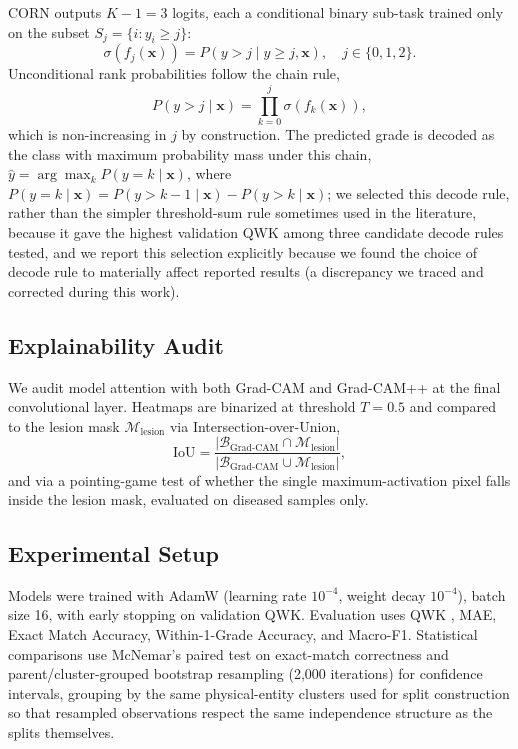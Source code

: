 \documentclass[conference]{IEEEtran}
\begin{document}
CORN outputs $K-1=3$ logits, each a conditional binary sub-task trained only on the subset $S_j=\{i:y_i\ge j\}$:
\begin{equation}
\sigma(f_j(\mathbf{x})) = P(y>j \mid y\ge j, \mathbf{x}), \quad j\in\{0,1,2\}.
\end{equation}
Unconditional rank probabilities follow the chain rule,
\begin{equation}
P(y>j\mid\mathbf{x}) = \prod_{k=0}^{j}\sigma(f_k(\mathbf{x})),
\label{eq:chain}
\end{equation}
which is non-increasing in $j$ by construction. The predicted grade is decoded as the class with maximum probability mass under this chain, $\hat{y} = \arg\max_k P(y=k\mid\mathbf{x})$, where $P(y=k\mid\mathbf{x}) = P(y>k-1\mid\mathbf{x}) - P(y>k\mid\mathbf{x})$; we selected this decode rule, rather than the simpler threshold-sum rule sometimes used in the literature, because it gave the highest validation QWK among three candidate decode rules tested, and we report this selection explicitly because we found the choice of decode rule to materially affect reported results (a discrepancy we traced and corrected during this work).

\subsection{Explainability Audit}
We audit model attention with both Grad-CAM \cite{selvaraju2017grad} and Grad-CAM++ \cite{chattopadhay2018gradcampp} at the final convolutional layer. Heatmaps are binarized at threshold $T=0.5$ and compared to the lesion mask $\mathcal{M}_{\text{lesion}}$ via Intersection-over-Union,
\begin{equation}
\text{IoU} = \frac{|\mathcal{B}_{\text{Grad-CAM}} \cap \mathcal{M}_{\text{lesion}}|}{|\mathcal{B}_{\text{Grad-CAM}} \cup \mathcal{M}_{\text{lesion}}|},
\end{equation}
and via a pointing-game test of whether the single maximum-activation pixel falls inside the lesion mask, evaluated on diseased samples only.

\subsection{Experimental Setup}
Models were trained with AdamW (learning rate $10^{-4}$, weight decay $10^{-4}$), batch size 16, with early stopping on validation QWK. Evaluation uses QWK \cite{cohen1968weighted}, MAE, Exact Match Accuracy, Within-1-Grade Accuracy, and Macro-F1. Statistical comparisons use McNemar's paired test \cite{mcnemar1947note} on exact-match correctness and parent/cluster-grouped bootstrap resampling (2,000 iterations) for confidence intervals, grouping by the same physical-entity clusters used for split construction so that resampled observations respect the same independence structure as the splits themselves.
\end{document}
